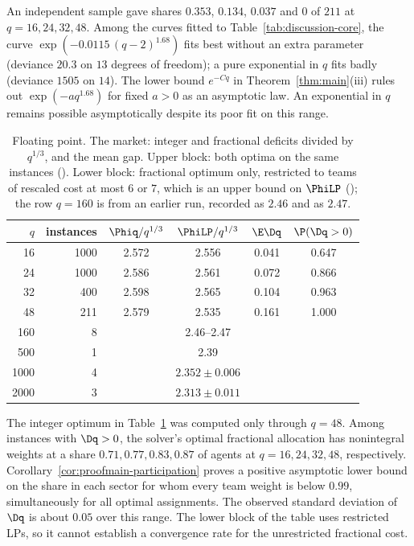 An independent sample gave shares $0.353$, $0.134$, $0.037$ and $0$ of $211$ at
$q=16,24,32,48$. Among the curves fitted to Table~\ref{tab:discussion-core}, the curve $\exp(-0.0115\,(q-2)^{1.68})$ fits best without an extra parameter (deviance
$20.3$ on $13$ degrees of freedom); a pure exponential in $q$ fits badly (deviance $1505$ on
$14$). The lower bound $e^{-Cq}$ in Theorem~\ref{thm:main}(iii) rules out
$\exp(-a q^{1.68})$ for fixed $a>0$ as an asymptotic law. An exponential in $q$ remains
possible asymptotically despite its poor fit on this range.

\begin{table}[ht]
\caption{Floating point. The market: integer and fractional deficits divided by $q^{1/3}$,
and the mean gap. Upper block: both optima on the same instances
(\protect{}). Lower block: fractional optimum only,
restricted to teams of rescaled cost at most $6$ or $7$, which is an upper bound on $\PhiLP$
(\protect{}); the row $q=160$ is from an earlier run,
recorded as $2.46$ and as $2.47$.}\label{tab:discussion-market}
\begin{tabular}{@{}rrcccc@{}}
\toprule
$q$ & instances & $\Phiq/q^{1/3}$ & $\PhiLP/q^{1/3}$ & $\E\Dq$ & $\P(\Dq>0)$ \\
\midrule
16 & 1000 & 2.572 & 2.556 & 0.041 & 0.647 \\
24 & 1000 & 2.586 & 2.561 & 0.072 & 0.866 \\
32 & 400 & 2.598 & 2.565 & 0.104 & 0.963 \\
48 & 211 & 2.579 & 2.535 & 0.161 & 1.000 \\
\midrule
160 & 8 & & 2.46--2.47 & & \\
500 & 1 & & 2.39 & & \\
1000 & 4 & & $2.352\pm0.006$ & & \\
2000 & 3 & & $2.313\pm0.011$ & & \\
\bottomrule
\end{tabular}
\end{table}

The integer optimum in Table~\ref{tab:discussion-market} was computed only through
$q=48$. Among instances with $\Dq>0$, the solver's optimal fractional allocation
has nonintegral weights at a share $0.71,0.77,0.83,0.87$ of agents at
$q=16,24,32,48$, respectively. Corollary~\ref{cor:proofmain-participation} proves a positive asymptotic
lower bound on the share in each sector for whom every team weight is below $0.99$,
simultaneously for all optimal assignments. The observed standard deviation of $\Dq$ is
about $0.05$ over this range. The lower block of the table uses restricted LPs,
so it cannot establish a convergence rate for the unrestricted fractional cost.

